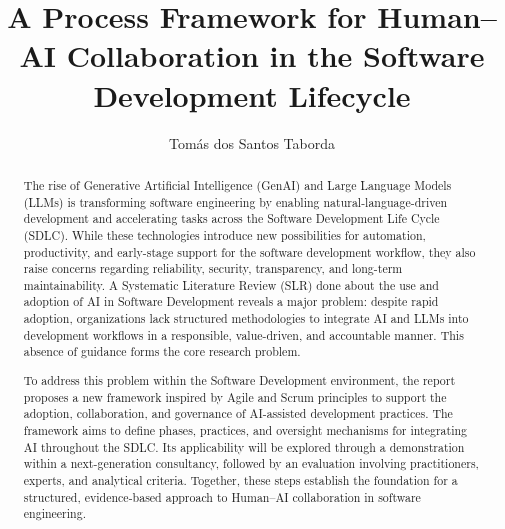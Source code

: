 \documentclass[a4paper]{article}
\begin{document}
\title{A Process Framework for Human–AI Collaboration in the Software Development Lifecycle} %
\author{Tomás dos Santos Taborda} %

\maketitle
\thispagestyle{empty}

\setlength{\abstitleskip}{-\absparindent}
\begin{abstract}
The rise of Generative Artificial Intelligence (GenAI) and Large Language Models (LLMs) is transforming software engineering by enabling natural-language-driven development and accelerating tasks across the Software Development Life Cycle (SDLC). While these technologies introduce new possibilities for automation, productivity, and early-stage support for the software development workflow, they also raise concerns regarding reliability, security, transparency, and long-term maintainability. A Systematic Literature Review (SLR) done about the use and adoption of AI in Software Development reveals a major problem: despite rapid adoption, organizations lack structured methodologies to integrate AI and LLMs into development workflows in a responsible, value-driven, and accountable manner. This absence of guidance forms the core research problem.

To address this problem within the Software Development environment, the report proposes a new framework inspired by Agile and Scrum principles to support the adoption, collaboration, and governance of AI-assisted development practices. The framework aims to define phases, practices, and oversight mechanisms for integrating AI throughout the SDLC. Its applicability will be explored through a demonstration within a next-generation consultancy, followed by an evaluation involving practitioners, experts, and analytical criteria. Together, these steps establish the foundation for a structured, evidence-based approach to Human–AI collaboration in software engineering.
\clearpage
\end{abstract}
\end{document}
